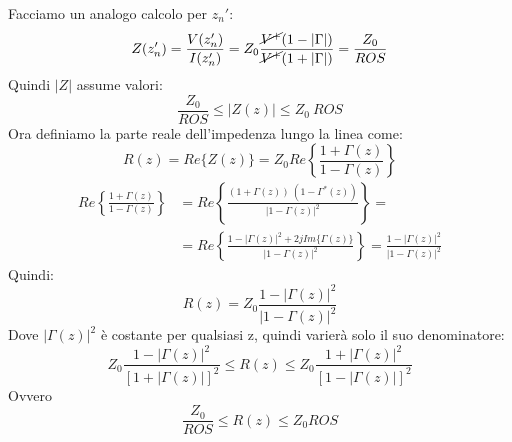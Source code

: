 Facciamo un analogo calcolo per $z_n'$:
\begin{equation*}
    Z(z_n') = \frac{V(z_n')}{I(z_n')} = Z_0 \frac{\cancel{V^+} (1 - |\Gamma|)}{\cancel{V^+} (1 + |\Gamma|)} = \frac{Z_0}{ROS}
\end{equation*}
Quindi $|Z|$ assume valori:
\begin{equation*}
    \frac{Z_0}{ROS} \leq |Z(z)| \leq Z_0 \ ROS
\end{equation*}
Ora definiamo la parte reale dell'impedenza lungo la linea come:
\begin{equation*}
    R(z) = Re\{Z(z)\} = Z_0 Re\left\{\frac{1 + \Gamma(z)}{ 1 - \Gamma(z)}\right\}
\end{equation*}
\begin{equation*}
\begin{aligned}
    Re\left\{\frac{1 + \Gamma(z)}{ 1 - \Gamma(z)}\right\} &=  Re\left\{\frac{(1 + \Gamma(z)) \ (1 - \Gamma^*(z)) }{ {|1 - \Gamma(z)|}^2}\right\} = \\
    &= Re\left\{\frac{1 - {|\Gamma(z)|}^2 + 2j Im\{\Gamma(z)\}}{ {|1 - \Gamma(z)|}^2}\right\} = \frac{1 - {|\Gamma(z)|}^2}{{|1 - \Gamma(z)|}^2} 
\end{aligned}
\end{equation*}
Quindi:
\begin{equation*}
    R(z) = Z_0 \frac{1 - {|\Gamma(z)|}^2}{{|1 - \Gamma(z)|}^2} 
\end{equation*}
Dove $|\Gamma(z)|^2$ è costante per qualsiasi z, quindi varierà solo il suo denominatore:
\begin{equation*}
    Z_0 \frac{1 - |\Gamma(z)|^2}{{[1 + |\Gamma(z)|]}^2}  \leq R(z) \leq Z_0 \frac{1 + |\Gamma(z)|^2}{{[1 - |\Gamma(z)|]}^2} 
\end{equation*}
Ovvero
\begin{equation*}
    \frac{Z_0}{ROS}  \leq R(z) \leq Z_0 ROS
\end{equation*}







